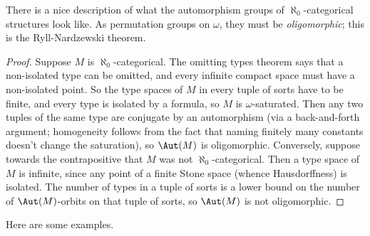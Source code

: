 There is a nice description of what the automorphism groups of $\aleph_0$-categorical structures look like. As permutation groups on $\omega$, they must be \emph{oligomorphic}; this is the Ryll-Nardzewski theorem.


\begin{proof}
Suppose $M$ is $\aleph_0$-categorical. The omitting types theorem says that a non-isolated type can be omitted, and every infinite compact space must have a non-isolated point. So the type spaces of $M$ in every tuple of sorts have to be finite, and every type is isolated by a formula, so $M$ is $\omega$-saturated. Then any two tuples of the same type are conjugate by an automorphism (via a back-and-forth argument; homogeneity follows from the fact that naming finitely many constants doesn't change the saturation), so $\Aut(M)$ is oligomorphic. Conversely, suppose towards the contrapositive that $M$ was not $\aleph_0$-categorical. Then a type space of $M$ is infinite, since any point of a finite Stone space (whence Hausdorffness) is isolated. The number of types in a tuple of sorts is a lower bound on the number of $\Aut(M)$-orbits on that tuple of sorts, so $\Aut(M)$ is not oligomorphic.
\end{proof}

Here are some examples.

